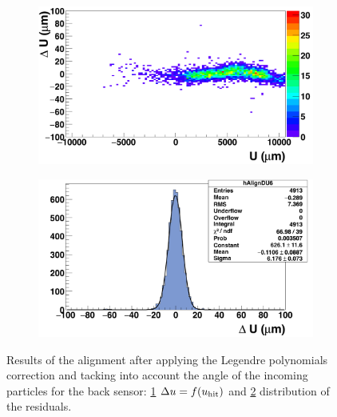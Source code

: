 \begin{figure}[!h]
        \begin{subfigure}[t]{0.45\textwidth}
          \centering
          \includegraphics[width = 1.2\textwidth]{Pictures/deformation/deltaUU_6_corrected1.png}
          \caption{}
          \label{fig:scatterDUU_corrected_back}
        \end{subfigure}
        \hfill
        \begin{subfigure}[t]{0.45\textwidth}
          \centering
          \includegraphics[width = 1.2\textwidth]{Pictures/deformation/deltaU_6_corrected1.png}
          \caption{}
          \label{fig:residualU_corrected_back}
        \end{subfigure}
        \caption{Results of the alignment after applying the Legendre polynomials correction and tacking into account the angle of the incoming particles for the back sensor: \ref{fig:scatterDUU_corrected_back} $\Delta u=f(u_{\rm{hit}})$ and \ref{fig:residualU_corrected_back} distribution of the residuals.}
        \label{fig:alignmnetCorrected_back}

      \end{figure}

